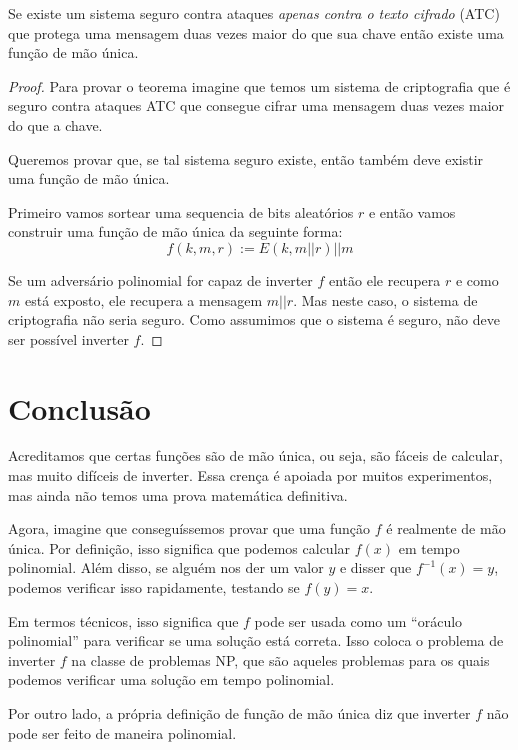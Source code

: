 \begin{theorem}
  Se existe um sistema seguro contra ataques {\em apenas contra o texto cifrado} (ATC) que protega uma mensagem duas vezes maior do que sua chave então existe uma função de mão única.
\end{theorem}
\begin{proof}
Para provar o teorema imagine que temos um sistema de criptografia que é seguro contra ataques ATC que consegue cifrar uma mensagem duas vezes maior do que a chave.

Queremos provar que, se tal sistema seguro existe, então também deve existir uma função de mão única.

Primeiro vamos sortear uma sequencia de bits aleatórios $r$ e então vamos construir uma função de mão única da seguinte forma:
\begin{displaymath}
  f(k, m, r) := E(k, m||r)||m
\end{displaymath}

Se um adversário polinomial for capaz de inverter $f$ então ele recupera $r$ e como $m$ está exposto, ele recupera a mensagem $m||r$.
Mas neste caso, o sistema de criptografia não seria seguro.
Como assumimos que o sistema é seguro, não deve ser possível inverter $f$.
\end{proof}

\section{Conclusão}

Acreditamos que certas funções são de mão única, ou seja, são fáceis de calcular, mas muito difíceis de inverter.
Essa crença é apoiada por muitos experimentos, mas ainda não temos uma prova matemática definitiva.

Agora, imagine que conseguíssemos provar que uma função $f$ é realmente de mão única.
Por definição, isso significa que podemos calcular $f(x)$ em tempo polinomial.
Além disso, se alguém nos der um valor $y$ e disser que $f^{-1}(x) = y$, podemos verificar isso rapidamente, testando se $f(y)=x$.

Em termos técnicos, isso significa que $f$ pode ser usada como um ``oráculo polinomial'' para verificar se uma solução está correta.
Isso coloca o problema de inverter $f$ na classe de problemas NP, que são aqueles problemas para os quais podemos verificar uma solução em tempo polinomial.

Por outro lado, a própria definição de função de mão única diz que inverter $f$ não pode ser feito de maneira polinomial.

